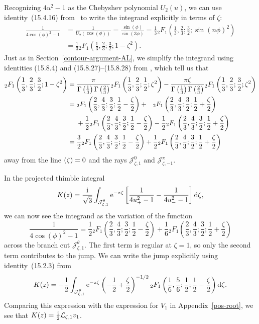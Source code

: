 \documentclass[10pt,a4paper]{amsart}
\let\Re\relax
\DeclareMathOperator{\Re}{Re}
\newcommand{\laplace}{\mathcal{L}}
\numberwithin{equation}{section}
\begin{document}
Recognizing $4u^2 - 1$ as the Chebyshev polynomial $U_2(u)$, we can use identity~(15.4.16) from~\cite{dlmf} to write the integrand explicitly in terms of $\zeta$:
\begin{align*}
\frac{1}{4 \cos(\phi)^2 - 1} & = \frac{1}{U_2(\cos(\phi))} = \frac{\sin(\phi)}{\sin(3\phi)} = \frac{1}{3} {}_2F_1\left(\frac{1}{3}, \frac{2}{3}; \frac{3}{2}; \sin(n \phi)^2\right) \\
& = \frac{1}{3} {}_2F_1\left(\frac{1}{3}, \frac{2}{3}; \frac{3}{2}; 1 - \zeta^2\right).
\end{align*}
Just as in Section~\ref{contour-argument-AL}, we simplify the integrand using identities (15.8.4) and (15.8.27)--(15.8.28) from \cite{dlmf}, which tell us that
\begin{align*}
{}_2F_1\left(\frac{1}{3}, \frac{2}{3}; \frac{3}{2}; 1 - \zeta^2\right)
 ={}&\frac{\pi}{\Gamma\left(\frac{1}{3}\right) \Gamma\left(\frac{2}{3}\right)} {}_2F_1\left(\frac{1}{3}, \frac{2}{3}; \frac{1}{2}; \zeta^2\right) - \frac{\pi \zeta}{\Gamma\left(\frac{1}{3}\right) \Gamma\left(\frac{2}{3}\right)} {}_2F_1\left(\frac{1}{3}, \frac{2}{3}; \frac{3}{2}; \zeta^2\right) \\
={}& {}_2F_1\left(\frac{2}{3}, \frac{4}{3}; \frac{3}{2}; \frac{1}{2} - \frac{\zeta}{2}\right) + \hphantom{\frac{0}{0}} {}_2F_1\left(\frac{2}{3}, \frac{4}{3}; \frac{3}{2}; \frac{1}{2} + \frac{\zeta}{2}\right) \\
& + \frac{1}{2} {}_2F_1\left(\frac{2}{3}, \frac{4}{3}; \frac{3}{2}; \frac{1}{2} - \frac{\zeta}{2}\right) - \frac{1}{2} {}_2F_1\left(\frac{2}{3}, \frac{4}{3}; \frac{3}{2}; \frac{1}{2} + \frac{\zeta}{2}\right) \\
={}&\frac{3}{2} {}_2F_1\left(\frac{2}{3}, \frac{4}{3}; \frac{3}{2};\frac{1}{2} - \frac{\zeta}{2}\right) + \frac{1}{2} {}_2F_1\left(\frac{2}{3}, \frac{4}{3}; \frac{3}{2}; \frac{1}{2} + \frac{\zeta}{2}\right)
\end{align*}
away from the line $\Re(\zeta) = 0$ and the rays $\mathcal{J}^0_{\zeta,1}$ and $\mathcal{J}^\pi_{\zeta,-1}$.

In the projected thimble integral
\[ K(z) = \frac{\rm i}{\sqrt{3}} \int_{\mathcal{J}^\theta_{\zeta, 1}} {\rm e}^{-z\zeta}\left[\frac{1}{4u_+^2 - 1} - \frac{1}{4u_-^2 - 1}\right] {\rm d}\zeta, \]
we can now see the integrand as the variation of the function
\[ \frac{1}{4\cos(\phi)^2 - 1} = \frac{1}{2} {}_2F_1\left(\frac{2}{3}, \frac{4}{3}; \frac{3}{2};\frac{1}{2} - \frac{\zeta}{2}\right) + \frac{1}{6} {}_2F_1\left(\frac{2}{3}, \frac{4}{3}; \frac{3}{2}; \frac{1}{2} + \frac{\zeta}{2}\right) \]
across the branch cut $\mathcal{J}^\theta_{\zeta,1}$. The first term is regular at $\zeta = 1$, so only the second term contributes to the jump. We can write the jump explicitly using identity~(15.2.3) from \cite{dlmf}
\[ K(z) = -\frac{1}{2} \int_{\mathcal{J}^\theta_{\zeta, 1}} {\rm e}^{-z\zeta} \left(-\frac{1}{2}+\frac{\zeta}{2}\right)^{-1/2} {}_2F_1\left(\frac{1}{6}, \frac{5}{6}; \frac{1}{2}; \frac{1}{2} - \frac{\zeta}{2}\right) {\rm d}\zeta. \]
Comparing this expression with the expression for $V_1$ in Appendix~\ref{pos-root}, we see that
$K(z) = \frac{\rm i}{2}\laplace_{\zeta, 1} v_1$.
\end{document}
